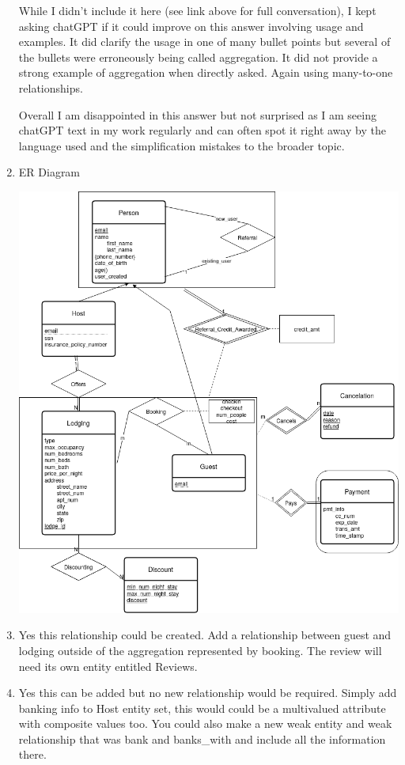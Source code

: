 \documentclass[11pt]{article}
\begin{document}
\begin{enumerate}
While I didn't include it here (see link above for full conversation), I kept asking chatGPT if it could improve on this answer involving usage and examples.  It did clarify the usage in one of many bullet points but several of the bullets were erroneously being called aggregation.  It did not provide a strong example of aggregation when directly asked.  Again using many-to-one relationships.

Overall I am disappointed in this answer but not surprised as I am seeing chatGPT text in my work regularly and can often spot it right away by the language used and the simplification mistakes to the broader topic.

\item ER Diagram

\includegraphics[width = \textwidth]{question1.png}

\item Yes this relationship could be created.  Add a relationship between guest and lodging outside of the aggregation represented by booking.  The review will need its own entity entitled Reviews. 

\item Yes this can be added but no new relationship would be required.  Simply add banking info to Host entity set, this would could be a multivalued attribute with composite values too.  You could also make a new weak entity and weak relationship that was bank and banks\_with and include all the information there.



\end{enumerate}
\end{document}
